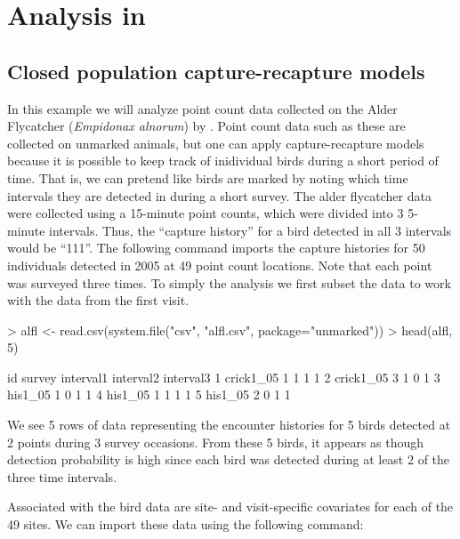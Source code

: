 \documentclass[a4paper]{article}
\renewenvironment{Schunk}{\vspace{\topsep}}{\vspace{\topsep}}
\begin{document}
\section{Analysis in }




\subsection{Closed population capture-recapture models}


In this example we will analyze point count data collected on the Alder
Flycatcher (\emph{Empidonax alnorum}) by
\citet{chandler_etal:2009}. Point count data such as these are
collected on unmarked animals, but one can apply
capture-recapture models because it is possible to keep track of
inidividual birds during a short period of time. That is, we can
pretend like birds are marked by noting which time intervals they are
detected in during a short survey. The alder flycatcher data were
collected using a 15-minute point counts, which were divided into 3
5-minute intervals. Thus, the ``capture history'' for a bird detected
in all 3 intervals would be ``111''. The following command imports the
capture histories for 50 individuals detected in 2005 at 49 point
count locations. Note that each point was surveyed three times. To
simply the analysis we first subset the data to work with the data
from the first visit.

\begin{Schunk}
\begin{Sinput}
> alfl <- read.csv(system.file("csv", "alfl.csv", package="unmarked"))
> head(alfl, 5)
\end{Sinput}
\begin{Soutput}
         id survey interval1 interval2 interval3
1 crick1_05      1         1         1         1
2 crick1_05      3         1         0         1
3   his1_05      1         0         1         1
4   his1_05      1         1         1         1
5   his1_05      2         0         1         1
\end{Soutput}
\end{Schunk}

We see 5 rows of data representing the encounter histories for 5 birds
detected at 2 points during 3 survey occasions. From these 5 birds, it appears as though
detection probability is high since each bird was detected during at
least 2 of the three time intervals.

Associated with the bird data are site- and visit-specific covariates
for each of the 49 sites. We can import these data using the following
command:
\end{document}
